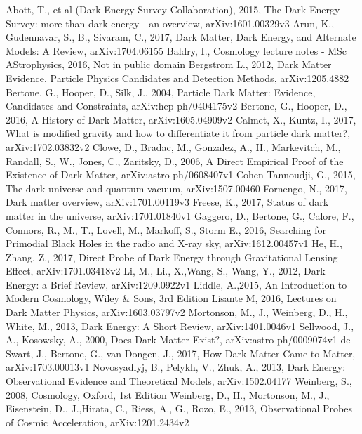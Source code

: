 \documentclass[a4paper,12pt]{article}
\begin{document}
\begin{thebibliography}{1}
Abott, T., et al (Dark Energy Survey Collaboration), 2015, The Dark Energy Survey: more than dark energy - an overview, arXiv:1601.00329v3
Arun, K., Gudennavar, S., B., Sivaram, C., 2017, Dark Matter, Dark Energy, and Alternate Models: A Review, arXiv:1704.06155
Baldry, I., Cosmology lecture notes - MSc AStrophysics, 2016, Not in public domain
Bergstrom L., 2012,  Dark Matter Evidence, Particle Physics Candidates and Detection Methods, arXiv:1205.4882
Bertone, G., Hooper, D., Silk, J., 2004, Particle Dark Matter: Evidence, Candidates and Constraints, arXiv:hep-ph/0404175v2
Bertone, G., Hooper, D., 2016, A History of Dark Matter, arXiv:1605.04909v2
Calmet, X., Kuntz, I., 2017, What is modified gravity and how to differentiate it from particle dark matter?, arXiv:1702.03832v2
Clowe, D., Bradac, M., Gonzalez, A., H., Markevitch, M., Randall, S., W., Jones, C., Zaritsky, D., 2006, A Direct Empirical Proof of the Existence of Dark Matter, arXiv:astro-ph/0608407v1
Cohen-Tannoudji, G., 2015, The dark universe and quantum vacuum, arXiv:1507.00460
Fornengo, N., 2017, Dark matter overview, arXiv:1701.00119v3
Freese, K., 2017, Status of dark matter in the universe, arXiv:1701.01840v1
Gaggero, D., Bertone, G., Calore, F., Connors, R., M., T., Lovell, M., Markoff, S., Storm E., 2016, Searching for Primodial Black Holes in the radio and X-ray sky, arXiv:1612.00457v1
He, H., Zhang, Z., 2017, Direct Probe of Dark Energy through Gravitational Lensing Effect, arXiv:1701.03418v2
Li, M., Li., X.,Wang, S., Wang, Y., 2012, Dark Energy: a Brief Review, arXiv:1209.0922v1
Liddle, A.,2015, An Introduction to Modern Cosmology, Wiley & Sons, 3rd Edition
Lisante M, 2016, Lectures on Dark Matter Physics, arXiv:1603.03797v2
Mortonson, M., J., Weinberg, D., H., White, M., 2013, Dark Energy: A Short Review, arXiv:1401.0046v1
Sellwood, J., A., Kosowsky, A., 2000, Does Dark Matter Exist?, arXiv:astro-ph/0009074v1
de Swart, J., Bertone, G., van Dongen, J., 2017, How Dark Matter Came to Matter, arXiv:1703.00013v1
Novosyadlyj, B., Pelykh, V., Zhuk, A., 2013, Dark Energy: Observational Evidence and Theoretical Models, arXiv:1502.04177
Weinberg, S., 2008, Cosmology, Oxford, 1st Edition
Weinberg, D., H., Mortonson, M., J., Eisenstein, D., J.,Hirata, C., Riess, A., G., Rozo, E., 2013, Observational Probes of Cosmic Acceleration, arXiv:1201.2434v2
\end{thebibliography}
\end{document}
